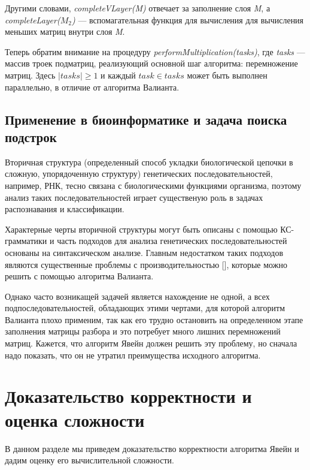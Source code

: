 \documentclass[14pt]{matmex-diploma-custom}
\begin{document}
Другими словами, \textit{completeVLayer(M)} отвечает за заполнение слоя \textit{M}, а \textit{completeLayer($M_{2}$)} --- вспомагательная функция для вычисления для вычисления меньших матриц внутри слоя \textit{M}.

Теперь обратим внимание на процедуру \textit{performMultiplication(tasks)}, где \textit{tasks} --- массив троек подматриц, реализующий основной шаг алгоритма: перемножение матриц.
Здесь $|tasks| \ge 1$ и каждый $task \in tasks$ может быть выполнен параллельно, в отличие от алгоритма Валианта.

\subsection{Применение в биоинформатике и задача поиска подстрок}

Вторичная структура (определенный способ укладки биологической цепочки в сложную, упорядоченную структуру) генетических последовательностей, например, РНК, тесно связана с биологическими функциями организма, поэтому анализ таких последовательностей играет существеную роль в задачах распознавания и классификации.

Характерные черты вторичной структуры могут быть описаны с помощью КС-грамматики и часть подходов для анализа генетических последовательностей основаны на синтаксическом анализе. Главным недостатком таких подходов являются существенные проблемы с производительностью [], которые можно решить с помощью алгоритма Валианта.

Однако часто возникащей задачей является нахождение не одной, а всех подпоследовательностей, обладающих этими чертами, для которой алгоритм Валианта плохо применим,  так как его трудно остановить на определенном этапе заполнения матрицы разбора и это потребует много лишних перемножений матриц. 
Кажется, что алгоритм Явейн должен решить эту проблему, но сначала надо показать, что он не утратил преимущества исходного алгоритма.

\section{Доказательство корректности и оценка сложности}

В данном разделе мы приведем доказательство корректности алгоритма Явейн и дадим оценку его вычислительной сложности.
\end{document}
